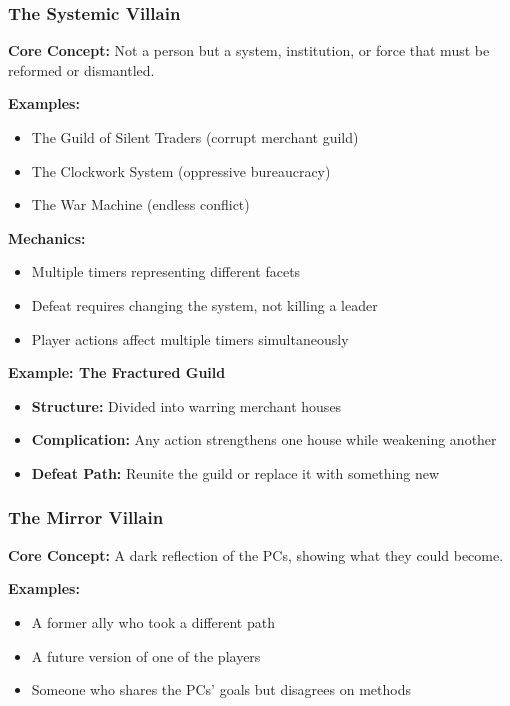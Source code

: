 \documentclass[10pt]{article}
\begin{document}
\subsubsection{The Systemic Villain}

\textbf{Core Concept:} Not a person but a system, institution, or force that must be reformed or dismantled.

\textbf{Examples:}
\begin{itemize}
  \item The Guild of Silent Traders (corrupt merchant guild)
  \item The Clockwork System (oppressive bureaucracy)
  \item The War Machine (endless conflict)
\end{itemize}

\textbf{Mechanics:}
\begin{itemize}
  \item Multiple timers representing different facets
  \item Defeat requires changing the system, not killing a leader
  \item Player actions affect multiple timers simultaneously
\end{itemize}

\textbf{Example: The Fractured Guild}
\begin{itemize}
  \item \textbf{Structure:} Divided into warring merchant houses
  \item \textbf{Complication:} Any action strengthens one house while weakening another
  \item \textbf{Defeat Path:} Reunite the guild or replace it with something new
\end{itemize}

\subsubsection{The Mirror Villain}

\textbf{Core Concept:} A dark reflection of the PCs, showing what they could become.

\textbf{Examples:}
\begin{itemize}
  \item A former ally who took a different path
  \item A future version of one of the players
  \item Someone who shares the PCs' goals but disagrees on methods
\end{itemize}
\end{document}
